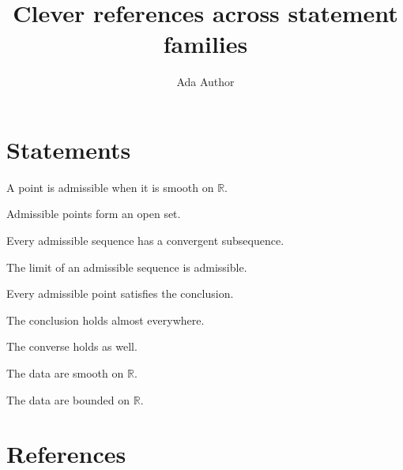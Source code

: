 \documentclass[11pt]{ocots-paper}
\title[Cleveref example]{Clever references across statement families}
\author{Ada Author}
\newcommand{\R}{\mathbb{R}}
\begin{document}
\maketitle

\section{Statements}

\begin{definition}
\label{def:admissible}
A point is admissible when it is smooth on $\R$.
\end{definition}

\begin{proposition}[Stability]
\label{prop:stability}
Admissible points form an open set.
\end{proposition}

\begin{lemma}[Compactness]
\label{lem:compactness}
Every admissible sequence has a convergent subsequence.
\end{lemma}

\begin{lemma}[Closedness]
\label{lem:closedness}
The limit of an admissible sequence is admissible.
\end{lemma}

\begin{theorem}
\label{thm:main}
Every admissible point satisfies the conclusion.
\end{theorem}

\begin{corollary}[Consequence]
\label{cor:consequence}
The conclusion holds almost everywhere.
\end{corollary}

\begin{conjecture}
\label{conj:open}
The converse holds as well.
\end{conjecture}

\begin{hypothesis}[Regularity]
\label{hyp:regularity}
The data are smooth on $\R$.
\end{hypothesis}

\begin{hypothesis}[Boundedness]
\label{hyp:bounded}
The data are bounded on $\R$.
\end{hypothesis}

\section{References}
\end{document}
